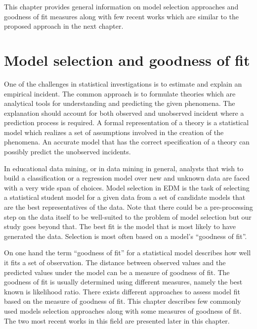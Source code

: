 \label{sec:RelatedWorks}

This chapter provides general information on model selection approaches and goodness of fit measures along with few recent works which are similar to the proposed approach in the next chapter. 


\section{Model selection and goodness of fit}
One of the challenges in statistical investigations is to estimate and explain an empirical incident. The common approach is to formulate theories which are analytical tools for understanding and predicting the given phenomena. The explanation should account for both observed and unobserved incident where a prediction process is required. A formal representation of a theory is a statistical model which realizes a set of assumptions involved in the creation of the phenomena. An accurate model that has the correct specification of a theory can possibly predict the unobserved incidents.

In educational data mining, or in data mining in general, analysts that wish to build a classification or a regression model over new and unknown data are faced with a very wide span of choices. Model selection in EDM is the task of selecting a statistical student model for a given data from a set of candidate models that are the best representatives of the data. Note that there could be a pre-processing step on the data itself to be well-suited to the problem of model selection but our study goes beyond that. The best fit is the model that is most likely to have generated the data. Selection is most often based on a model's ``goodness of fit''.

On one hand the term ``goodness of fit''  for a statistical model describes how well it fits a set of observation. The distance between observed values and the predicted values under the model can be a measure of goodness of fit. The goodness of fit is usually determined using different measures, namely the best known is likelihood ratio. There exists different approaches to assess model fit based on the measure of goodness of fit. This chapter describes few commonly used models selection approaches along with some measures of goodness of fit. The two most recent works \citep{Desmarais2010,Rosenberg2015} in this field are presented later in this chapter.

